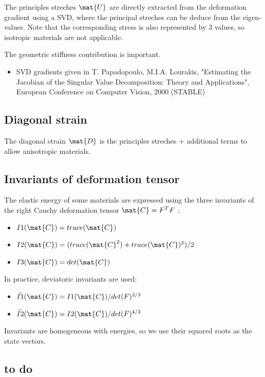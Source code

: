 The principles streches $\mat{U}$ are directly extracted from the deformation gradient using a SVD, where the principal streches can be deduce from the eigen-values.
Note that the corresponding stress is also represented by 3 values, so isotropic materials are not applicable.

The geometric stiffness contribution is important.
\begin{itemize}
\item SVD gradients given in T. Papadopoulo, M.I.A. Lourakis, "Estimating the Jacobian of the Singular Value Decomposition: Theory and Applications", European Conference on Computer Vision, 2000 (STABLE)
\end{itemize}

\subsection{Diagonal strain}

The diagonal strain $\mat{D}$ is the principles streches + additional terms to allow anisotropic materials. 


\subsection{Invariants of deformation tensor}

The elastic energy of some materials are expressed using the three invariants of the right Cauchy deformation tensor $\mat{C}=\defograd^T \defograd$ :

\begin{itemize}
 \item $I1(\mat{C}) = trace(\mat{C})$
 \item $I2(\mat{C}) = ( trace(\mat{C}^2)+trace(\mat{C})^2 )/2$
 \item $I3(\mat{C}) = det(\mat{C})$
\end{itemize}

In practice, deviatoric invariants are used:
\begin{itemize}
 \item $\tilde{I1}(\mat{C}) = I1(\mat{C})/det(\defograd)^{2/3}$
 \item $\tilde{I2}(\mat{C}) = I2(\mat{C})/det(\defograd)^{4/3}$
\end{itemize}

Invariants are homogeneous with energies, so we use their squared roots as the state vectors.

\subsection{to do}


